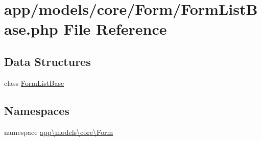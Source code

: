 \hypertarget{_form_list_base_8php}{\section{app/models/core/\-Form/\-Form\-List\-Base.php File Reference}
\label{_form_list_base_8php}
}
\subsection*{Data Structures}
\begin{DoxyCompactItemize}
\item 
class \hyperlink{classapp_1_1models_1_1core_1_1_form_1_1_form_list_base}{Form\-List\-Base}
\end{DoxyCompactItemize}
\subsection*{Namespaces}
\begin{DoxyCompactItemize}
\item 
namespace \hyperlink{namespaceapp_1_1models_1_1core_1_1_form}{app\textbackslash{}models\textbackslash{}core\textbackslash{}\-Form}
\end{DoxyCompactItemize}
